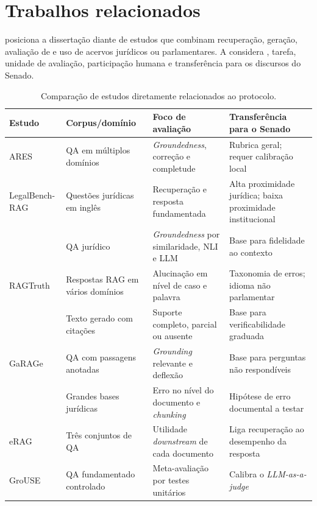 \section{Trabalhos relacionados}

 posiciona a dissertação diante de estudos que combinam recuperação, geração, avaliação de
 e uso de acervos jurídicos ou parlamentares. A  considera
, tarefa, unidade de avaliação, participação humana e transferência para os discursos
do Senado. 

\begin{table}[hb!]
\centering
\caption{Comparação de estudos diretamente relacionados ao protocolo.}
\label{tab:trabalhos-relacionados}
\small
\begin{tabular}{p{2.7cm}p{2.8cm}p{3.1cm}p{2.5cm}}
\toprule
Estudo & Corpus/domínio & Foco de avaliação & Transferência para o Senado \\
\midrule
ARES & QA em múltiplos domínios & \textit{Groundedness}, correção e completude & Rubrica geral; requer calibração local \\
LegalBench-RAG & Questões jurídicas em inglês & Recuperação e resposta fundamentada & Alta proximidade jurídica; baixa proximidade institucional \\
\textcite{trautmannEtAl2024groundedness} & QA jurídico & \textit{Groundedness} por similaridade, NLI e LLM & Base para fidelidade ao contexto \\
RAGTruth & Respostas RAG em vários domínios & Alucinação em nível de caso e palavra & Taxonomia de erros; idioma não parlamentar \\
\textcite{zhangEtAl2024fineGrainedCitation} & Texto gerado com citações & Suporte completo, parcial ou ausente & Base para verificabilidade graduada \\
GaRAGe & QA com passagens anotadas & \textit{Grounding} relevante e deflexão & Base para perguntas não respondíveis \\
\textcite{reuterEtAl2025reliableRetrieval} & Grandes bases jurídicas & Erro no nível do documento e \textit{chunking} & Hipótese de erro documental a testar \\
eRAG & Três conjuntos de QA & Utilidade \textit{downstream} de cada documento & Liga recuperação ao desempenho da resposta \\
GroUSE & QA fundamentado controlado & Meta-avaliação por testes unitários & Calibra o \textit{LLM-as-a-judge} \\
\bottomrule
\end{tabular}
\end{table}

